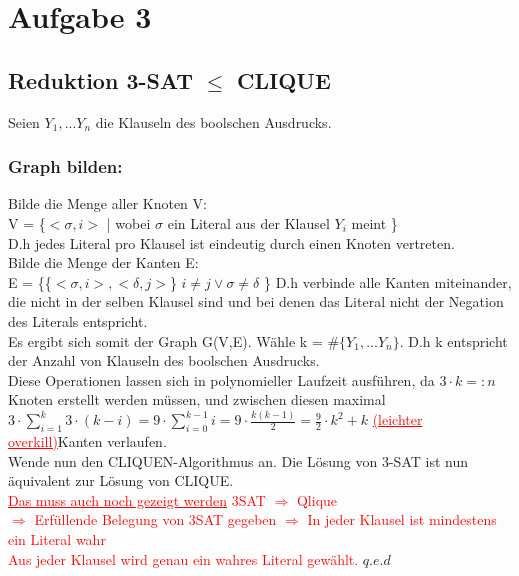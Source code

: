 \documentclass[a4paper,11pt,twoside]{article}
\newcommand{\korr}[2]{\sout{#1} \textcolor{red}{\underline{#2}}}
\newcommand{\red}[1]{\textcolor{red}{#1}}
\begin{document}
\section*{Aufgabe 3}
\subsection*{Reduktion 3-SAT $\le$ CLIQUE}
Seien $Y_1, ... Y_n$ die Klauseln des boolschen Ausdrucks.

\subsubsection*{Graph bilden:}
Bilde die Menge aller Knoten V:\\
V = \{$<\sigma, i>$ | wobei $\sigma$ ein Literal aus der Klausel $Y_i$ meint \}\\
D.h jedes Literal pro Klausel ist eindeutig durch einen Knoten vertreten.\\

Bilde die Menge der Kanten E:\\
E = \{\{$<\sigma, i>, <\delta, j>$\} $i \not= j \lor \sigma \not= \delta$ \}
D.h verbinde alle Kanten miteinander, die nicht in der selben Klausel sind und bei denen das Literal nicht der Negation des Literals entspricht.\\

Es ergibt sich somit der Graph G(V,E). Wähle k = $\#\{Y_1, ... Y_n\}$. D.h k entspricht der Anzahl von Klauseln des boolschen Ausdrucks.\\
Diese Operationen lassen sich in polynomieller Laufzeit ausführen, da $3\cdot k =: n$ Knoten erstellt werden müssen, und zwischen diesen maximal $3\cdot\sum_{i=1}^{k}3\cdot(k-i)=9\cdot\sum_{i=0}^{k-1} i = 9\cdot\frac{k(k-1)}{2}=\frac{9}{2}\cdot k^2+k$ \korr{}{(leichter overkill)}Kanten verlaufen.\\

Wende nun den CLIQUEN-Algorithmus an. Die Lösung von 3-SAT ist nun äquivalent zur Lösung von CLIQUE.\\
\korr{}{Das muss auch noch gezeigt werden}
\red{3SAT $\Rightarrow$ Qlique}\\
\red{$\Rightarrow$ Erfüllende Belegung von 3SAT gegeben}
\red{$\Rightarrow$ In jeder Klausel ist mindestens ein Literal wahr}\\
\red{Aus jeder Klausel wird genau ein wahres Literal gewählt.}
$q.e.d$
\end{document}
